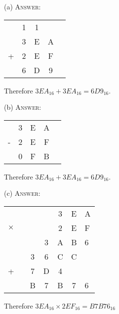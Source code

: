 
(a)
\textsc{Answer:}\vspace{-2mm}
\begin{answerlong}
\begin{longtable}{ccccc}
  & 1 & 1 &   \\
  & 3 & E & A \\
+ & 2 & E & F \\\hline
  & 6 & D & 9 \\\hline
\end{longtable}
Therefore $3EA_{16} + 3EA_{16} = 6D9_{16}$.
\end{answerlong}
  
(b)
\textsc{Answer:}\vspace{-2mm}
\begin{answerlong}
\begin{longtable}{ccccc}
  & 3 & E & A \\
- & 2 & E & F \\\hline
  & 0 & F & B \\\hline
\end{longtable}
Therefore $3EA_{16} + 3EA_{16} = 6D9_{16}$.
\end{answerlong}

(c)
\textsc{Answer:}\vspace{-2mm}
\begin{answerlong}
    \begin{longtable}{cccccc}
            &   &   &   & 3 & E & A \\
$\times$    &   &   &   & 2 & E & F \\ \hline
            &   &   & 3 & A & B & 6 \\
            &   & 3 & 6 & C & C &   \\
+           &   & 7 & D & 4 &   &   \\ \hline
            &   & B & 7 & B & 7 & 6 \\ \hline
\end{longtable}
Therefore $3EA_{16} \times 2EF_{16} = B7B76_{16}$
\end{answerlong}

